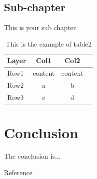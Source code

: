 \documentclass[12pt, twoside , openright]{book}
\begin{document}
\section{Sub-chapter}\label{sub_chapter}
This is your sub chapter. \blindtext[2]
\begin{table}[h!]
	\begin{center}
		\caption{This is the example of table2}
		\label{table:table2}
		\begin{tabular}{|l|c|c|c|}
			\hline
			\textbf{Layer} & \textbf{Col1} & \textbf{Col2} \\ %
			\hline
			Row1 & content & content \\ %
			Row2 & a & b \\ %
			Row3 & c & d \\ %
			\hline
		\end{tabular}
	\end{center}
\end{table}




\chapter{Conclusion}
The conclusion is... \blindtext[1] %
\newpage
\mbox{}
\newpage



\begin{center}
	{\chinnesesize Reference}
\end{center}



\newpage
\mbox{}
\newpage
\end{document}
